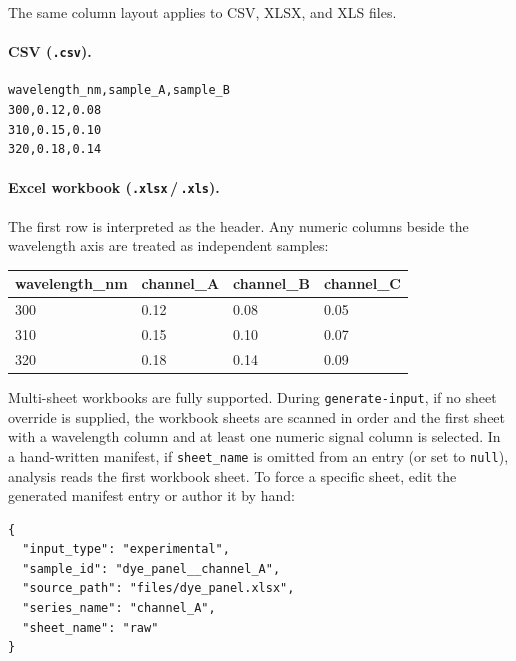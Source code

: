 \documentclass[11pt,a4paper]{article}
\begin{document}
The same column layout applies to CSV, XLSX, and XLS files.

\paragraph{CSV (\texttt{.csv}).}
\begin{lstlisting}
wavelength_nm,sample_A,sample_B
300,0.12,0.08
310,0.15,0.10
320,0.18,0.14
\end{lstlisting}

\paragraph{Excel workbook (\texttt{.xlsx}\,/\,\texttt{.xls}).}
The first row is interpreted as the header. Any numeric columns beside
the wavelength axis are treated as independent samples:

\begin{longtable}{@{}p{3.2cm}p{2.6cm}p{2.6cm}p{2.6cm}@{}}
\toprule
\textbf{wavelength\_nm} & \textbf{channel\_A} & \textbf{channel\_B} & \textbf{channel\_C} \\
\midrule
\endhead
300 & 0.12 & 0.08 & 0.05 \\
310 & 0.15 & 0.10 & 0.07 \\
320 & 0.18 & 0.14 & 0.09 \\
\bottomrule
\end{longtable}

\noindent Multi-sheet workbooks are fully supported. During
\texttt{generate-input}, if no sheet override is supplied, the workbook
sheets are scanned in order and the first sheet with a wavelength column
and at least one numeric signal column is selected. In a hand-written
manifest, if \texttt{sheet\_name} is omitted from an entry (or set to
\texttt{null}), analysis reads the first workbook sheet. To force a
specific sheet, edit the generated manifest entry or author it by hand:

\begin{lstlisting}[language=jsonish]
{
  "input_type": "experimental",
  "sample_id": "dye_panel__channel_A",
  "source_path": "files/dye_panel.xlsx",
  "series_name": "channel_A",
  "sheet_name": "raw"
}
\end{lstlisting}
\end{document}
